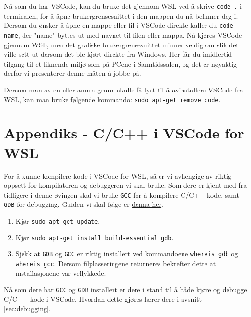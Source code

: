 Nå som du har VSCode, kan du bruke det gjennom WSL ved å skrive \verb|code .| i terminalen, for å åpne brukergrensesnittet i den mappen du nå befinner deg i. Dersom du ønsker å åpne en mappe eller fil i VSCode direkte kaller du \verb|code name|, der "name" byttes ut med navnet til filen eller mappa. Nå kjøres VSCode gjennom WSL, men det grafiske brukergrensesnittet minner veldig om slik det ville sett ut dersom det ble kjørt direkte fra Windows. Her får du imidlertid tilgang til et liknende miljø som på PCene i Sanntidssalen, og det er nøyaktig derfor vi presenterer denne måten å jobbe på.

Dersom man av en eller annen grunn skulle få lyst til å avinstallere VSCode fra WSL, kan man bruke følgende kommando: \verb|sudo apt-get remove code|.

\section{Appendiks - C/C++ i VSCode for WSL}\label{app:C_VSCode_WSL}
For å kunne kompilere kode i VSCode for WSL, så er vi avhengige av riktig oppsett for kompilatoren og debuggeren vi skal bruke. Som dere er kjent med fra tidligere i denne øvingen skal vi bruke \verb|GCC| for å kompilere C/C++-kode, samt \verb|GDB| for debugging. Guiden vi skal følge er \href{https://code.visualstudio.com/docs/cpp/config-wsl}{denna her}.

\begin{enumerate}
    \item Kjør \verb|sudo apt-get update|.
    \item Kjør \verb|sudo apt-get install build-essential gdb|.
    \item Sjekk at \verb|GDB| og \verb|GCC| er riktig installert ved kommandoene \verb|whereis gdb| og \verb|whereis gcc|. Dersom filplasseringene returneres bekrefter dette at installasjonene var vellykkede.
\end{enumerate}

Nå som dere har \verb|GCC| og \verb|GDB| installert er dere i stand til å både kjøre og debugge C/C++-kode i VSCode. Hvordan dette gjøres lærer dere i avsnitt \ref{sec:debugging}.